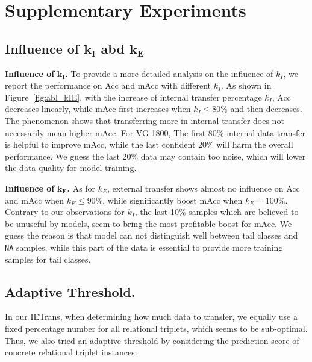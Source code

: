 \documentclass[runningheads]{llncs}
\begin{document}
\section{Supplementary Experiments}
\subsection{Influence of $\boldsymbol{k_I}$ abd $\boldsymbol{k_E}$}
\smallskip
\noindent
\textbf{Influence of } $\boldsymbol{k_I}$\textbf{.}
To provide a more detailed analysis on the influence of $k_I$, we report the performance on Acc and mAcc with different $k_I$.
As shown in Figure~\ref{fig:abl_kIE}, with the increase of internal transfer percentage $k_I$, Acc decreases linearly, while mAcc first increases when $k_I\leq80\%$ and then decreases.
The phenomenon shows that transferring more in internal transfer does not necessarily mean higher mAcc.
For VG-1800, The first 80\% internal data transfer is helpful to improve mAcc, while the last confident 20\% will harm the overall performance.
We guess the last 20\% data may contain too noise, which will lower the data quality for model training.


\smallskip
\noindent
\textbf{Influence of } $\boldsymbol{k_E}$\textbf{.}
As for $k_E$, external transfer shows almost no influence on Acc and mAcc when $k_E \leq 90\%$, while significantly boost mAcc when $k_E=100\%$.
Contrary to our observations for $k_I$, the last 10\% samples which are believed to be unuseful by models, seem to bring the most profitable boost for mAcc.
We guess the reason is that model can not distinguish well between tail classes and \texttt{NA} samples, while this part of the data is essential to provide more training samples for tail classes.










\subsection{Adaptive Threshold.}
In our IETrans, when determining how much data to transfer, we equally use a fixed percentage number for all relational triplets, which seems to be sub-optimal.
Thus, we also tried an adaptive threshold by considering the prediction score of concrete relational triplet instances.
\end{document}
